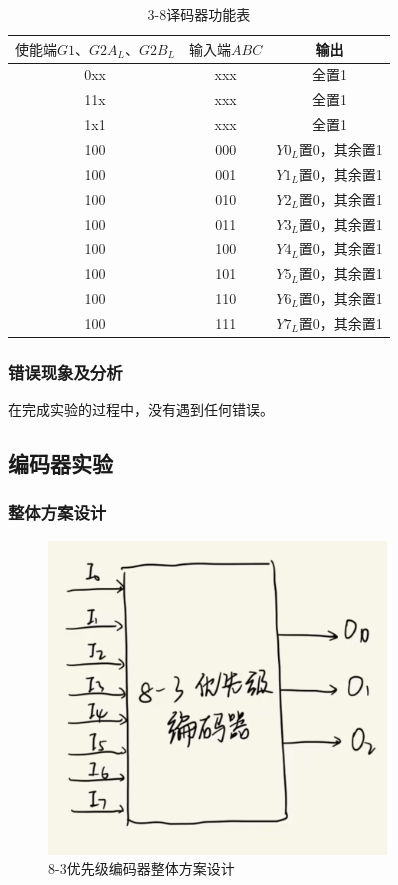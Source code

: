 \documentclass{article}
\begin{document}
    \begin{table}[H]
    \centering
    \begin{tabular}{|c|c|c|}
        \hline
        $使能端G1、G2A_L、G2B_L$ & $输入端ABC$ & 输出 \\ \hline
        0xx & xxx & 全置1 \\ \hline
        11x & xxx & 全置1 \\ \hline
        1x1 & xxx & 全置1 \\ \hline
        100 & 000 & $Y0_L$置0，其余置1 \\ \hline
        100 & 001 & $Y1_L$置0，其余置1 \\ \hline
        100 & 010 & $Y2_L$置0，其余置1 \\ \hline
        100 & 011 & $Y3_L$置0，其余置1 \\ \hline
        100 & 100 & $Y4_L$置0，其余置1 \\ \hline
        100 & 101 & $Y5_L$置0，其余置1 \\ \hline
        100 & 110 & $Y6_L$置0，其余置1 \\ \hline
        100 & 111 & $Y7_L$置0，其余置1 \\ \hline
    \end{tabular}
    \caption{3-8译码器功能表}
    \end{table}

    \subsubsection{错误现象及分析}
    在完成实验的过程中，没有遇到任何错误。
    
    \subsection{编码器实验}

    \subsubsection{整体方案设计}
    \begin{figure}[H]
    \centering
    \includegraphics[width=0.8\textwidth]{2.1.png}
    \caption{8-3优先级编码器整体方案设计}
    \end{figure}
\end{document}
